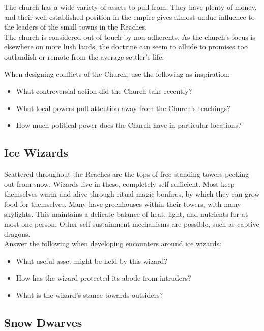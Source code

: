 \documentclass[notitlepage]{article}
\begin{document}
\begin{multicols*}{2}
  The church has a wide variety of assets to pull from.
  They have plenty of money, and their well-established position in the empire gives almost undue influence to the leaders of the small towns in the Reaches. \\

  The church is considered out of touch by non-adherents.
  As the church's focus is elsewhere on more lush lands, the doctrine can seem to allude to promises too outlandish or remote from the average settler's life.

  When designing conflicts of the Church, use the following as inspiration:

  \begin{itemize}
  \item What controversial action did the Church take recently?
  \item What local powers pull attention away from the Church's teachings?
  \item How much political power does the Church have in particular locations?
  \end{itemize}

  \subsection*{Ice Wizards}

  Scattered throughout the Reaches are the tops of free-standing towers peeking out from snow.
  Wizards live in these, completely self-sufficient.
  Most keep themselves warm and alive through ritual magic bonfires, by which they can grow food for themselves.
  Many have greenhouses within their towers, with many skylights.
  This maintains a delicate balance of heat, light, and nutrients for at most one person.
  Other self-sustainment mechanisms are possible, such as captive dragons. \\

  Answer the following when developing encounters around ice wizards:

  \begin{itemize}
  \item What useful asset might be held by this wizard?
  \item How has the wizard protected its abode from intruders?
  \item What is the wizard's stance towards outsiders?
  \end{itemize}

  \subsection*{Snow Dwarves}


\end{multicols*}
\end{document}
